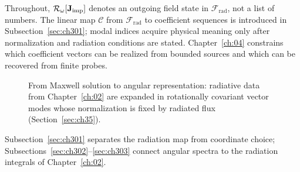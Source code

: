 Throughout, $\mathcal{R}_\omega[\mathbf{J}_{\mathrm{imp}}]$ denotes an outgoing field state in $\mathcal{F}_{\mathrm{rad}}$, not a list of numbers. The linear map $\mathcal{C}$ from $\mathcal{F}_{\mathrm{rad}}$ to coefficient sequences is introduced in Subsection~\ref{sec:ch301}; modal indices acquire physical meaning only after normalization and radiation conditions are stated. Chapter~\ref{ch:04} constrains which coefficient vectors can be realized from bounded sources and which can be recovered from finite probes.
\begin{figure}[t]
\centering
{}
\caption{From Maxwell solution to angular representation: radiative data from Chapter~\ref{ch:02} are expanded in rotationally covariant vector modes whose normalization is fixed by radiated flux (Section~\ref{sec:ch35}).}
\label{fig:ch3.laboratory-chain}
\end{figure}

Subsection~\ref{sec:ch301} separates the radiation map from coordinate choice; Subsections~\ref{sec:ch302}--\ref{sec:ch303} connect angular spectra to the radiation integrals of Chapter~\ref{ch:02}.
